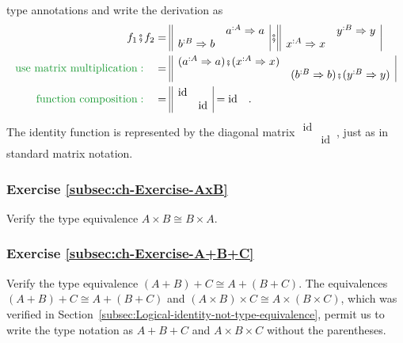 type annotations and write the derivation as
\begin{align*}
f_{1}\bef f_{2} & =\begin{array}{||cc|}
 & a^{:A}\Rightarrow a\\
b^{:B}\Rightarrow b & 
\end{array}\bef\begin{array}{||cc|}
 & y^{:B}\Rightarrow y\\
x^{:A}\Rightarrow x & 
\end{array}\\
{\color{greenunder}\text{use matrix multiplication}:}\quad & =\begin{array}{||cc|}
(a^{:A}\Rightarrow a)\bef(x^{:A}\Rightarrow x) & \\
 & (b^{:B}\Rightarrow b)\bef(y^{:B}\Rightarrow y)
\end{array}\\
{\color{greenunder}\text{function composition}:}\quad & =\begin{array}{||cc|}
\text{id} & \\
 & \text{id}
\end{array}=\text{id}\quad.
\end{align*}
The identity function is represented by the diagonal matrix $\begin{array}{||cc|}
\text{id} & \\
 & \text{id}
\end{array}\,$, just as in standard matrix notation.

\subsubsection{Exercise \label{subsec:ch-Exercise-AxB}\ref{subsec:ch-Exercise-AxB}}

Verify the type equivalence $A\times B\cong B\times A$.

\subsubsection{Exercise \label{subsec:ch-Exercise-A+B+C}\ref{subsec:ch-Exercise-A+B+C}}

Verify the type equivalence $\left(A+B\right)+C\cong A+\left(B+C\right)$.
The equivalences $\left(A+B\right)+C\cong A+\left(B+C\right)$ and
$\left(A\times B\right)\times C\cong A\times\left(B\times C\right)$,
which was verified in Section~\ref{subsec:Logical-identity-not-type-equivalence},
permit us to write the type notation as $A+B+C$ and $A\times B\times C$
without the parentheses.

